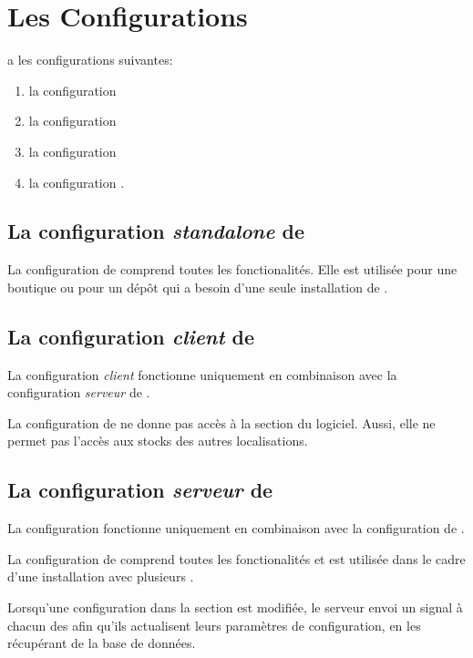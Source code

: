 \chapter{Les Configurations}\label{chap:congigurations-yeren}



\yeren a les configurations suivantes:
\begin{enumerate}[1)]
	\item la configuration 
	\item la configuration 
	\item la configuration 
	\item la configuration .\\
\end{enumerate}

\section{La configuration \emph{standalone} de \yeren}
La configuration  de \yeren comprend
toutes les fonctionalit\'es. Elle est utilis\'ee pour
une boutique ou pour un d\'ep\^ot qui a besoin d'une seule
installation de \yeren.

\section{La configuration \emph{client} de \yeren}
La configuration \emph{client} fonctionne uniquement en
combinaison avec la configuration \emph{serveur} de \yeren.

La configuration  de \yeren ne donne pas
acc\`es \`a la section  du logiciel.
Aussi, elle ne permet pas l'acc\`es aux stocks des autres
localisations.

\section{La configuration \emph{serveur} de \yeren}
La configuration  fonctionne uniquement en
combinaison avec la configuration  de \yeren.

La configuration  de \yeren comprend
toutes les fonctionalit\'es et est utilis\'ee dans
le cadre d'une installation avec plusieurs .

Lorsqu'une configuration dans la section  est modifi\'ee, le serveur envoi
un signal \`a chacun des  afin qu'ils
actualisent leurs param\`etres de configuration, en
les r\'ecup\'erant de la base de donn\'ees.
